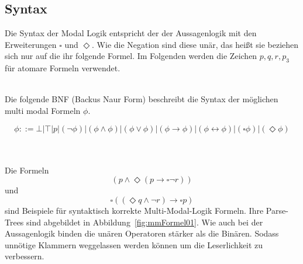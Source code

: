 
\subsection{Syntax} %
\label{sec:syntax}
Die Syntax der Modal Logik entspricht der der Aussagenlogik mit den Erweiterungen $\square$ und $\Diamond$. 
Wie die Negation sind diese unär, das heißt sie beziehen sich nur auf die ihr folgende Formel. Im Folgenden werden die Zeichen $p, q, r, p_3$ für atomare Formeln verwendet.\cite[S.307f]{huth2004logic}\\
\\
\begin{definition}
	\label{def:syntax}
	Die folgende BNF (Backus Naur Form) beschreibt die Syntax der möglichen multi modal Formeln $\phi$.

	\begin{equation}
		\label{eqn:bnf}
		\phi ::= \bot|\top|p|(\neg\phi)|(\phi\wedge\phi)|(\phi\vee\phi)|(\phi\rightarrow\phi)|
		(\phi\leftrightarrow\phi)|(\square\phi)|(\Diamond\phi)
	\end{equation}
\end{definition}
\cite[S.307]{huth2004logic}
\\
\\
Die Formeln 
\begin{equation}
	(p \wedge \Diamond(p \rightarrow \square \neg r))
\end{equation} 
und 
\begin{equation}
	\square((\Diamond q \wedge \neg r) \rightarrow \square p )	
\end{equation}
sind Beispiele für syntaktisch korrekte Multi-Modal-Logik Formeln. Ihre Parse-Trees sind abgebildet in Abbildung~\ref{fig:mmFormel01}.
Wie auch bei der Aussagenlogik binden die unären Operatoren stärker als die Binären.
Sodass unnötige Klammern weggelassen werden können um die Leserlichkeit zu verbessern.\\
\\
